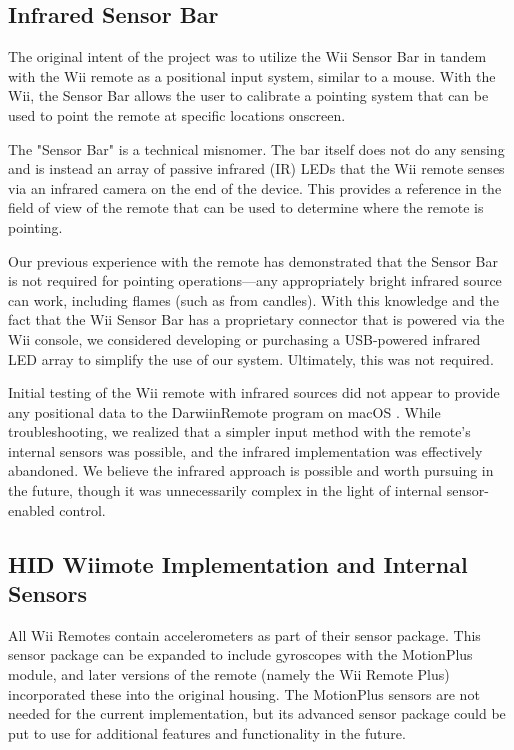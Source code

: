 \documentclass[conf]{new-aiaa}
\begin{document}
    \subsection{Infrared Sensor Bar}
        
        The original intent of the project was to utilize the Wii Sensor Bar in tandem with the Wii remote as a positional input system, similar to a mouse. With the Wii, the Sensor Bar allows the user to calibrate a pointing system that can be used to point the remote at specific locations onscreen.
        
        The "Sensor Bar" is a technical misnomer. The bar itself does not do any sensing and is instead an array of passive infrared (IR) LEDs that the Wii remote senses via an infrared camera on the end of the device. This provides a reference in the field of view of the remote that can be used to determine where the remote is pointing.
        
        Our previous experience with the remote has demonstrated that the Sensor Bar is not required for pointing operations---any appropriately bright infrared source can work, including flames (such as from candles). With this knowledge and the fact that the Wii Sensor Bar has a proprietary connector that is powered via the Wii console, we considered developing or purchasing a USB-powered infrared LED array to simplify the use of our system. Ultimately, this was not required.
        
        Initial testing of the Wii remote with infrared sources did not appear to provide any positional data to the DarwiinRemote program on macOS \cite{Darwiin}. While troubleshooting, we realized that a simpler input method with the remote's internal sensors was possible, and the infrared implementation was effectively abandoned. We believe the infrared approach is possible and worth pursuing in the future, though it was unnecessarily complex in the light of internal sensor-enabled control.
    
    \subsection{HID Wiimote Implementation and Internal Sensors} \label{WiiIMP}%
        
        All Wii Remotes contain accelerometers as part of their sensor package. This sensor package can be expanded to include gyroscopes with the MotionPlus module, and later versions of the remote (namely the Wii Remote Plus) incorporated these into the original housing. The MotionPlus sensors are not needed for the current implementation, but its advanced sensor package could be put to use for additional features and functionality in the future.
        
\end{document}
